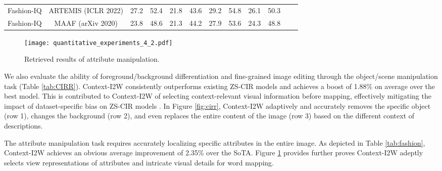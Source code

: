 \documentclass[letterpaper]{article} \usepackage{aaai24}  \usepackage{times}  \usepackage{helvet}  \usepackage{courier}  \usepackage[hyphens]{url}  \usepackage{graphicx} \urlstyle{rm} \def\UrlFont{\rm}  \usepackage{natbib}  \usepackage{caption} \frenchspacing  \setlength{\pdfpagewidth}{8.5in} \setlength{\pdfpageheight}{11in} \usepackage{algorithm}
\begin{document}
\begin{table*}[t]
{\begin{tabular}{cccccccccccc}
Fashion-IQ                  & ARTEMIS  (ICLR 2022)                                                & 27.2                                 & \multicolumn{1}{c|}{52.4}                        & 21.8                        & \multicolumn{1}{c|}{43.6}                        & 29.2                                 & \multicolumn{1}{c|}{54.8}                        & 26.1                        & 50.3                        \\
Fashion-IQ                  & MAAF (arXiv 2020)                                                    & 23.8                                 & \multicolumn{1}{c|}{48.6}                        & 21.3                        & \multicolumn{1}{c|}{44.2}                        & 27.9                                 & \multicolumn{1}{c|}{53.6}                        & 24.3                        & 48.8                        \\ \bottomrule
\end{tabular}}
\caption{Results on Fashion-IQ for attribute manipulation.}
\label{tab:fashion}
\end{table*}


\begin{figure}[t]
    \centering
\centering
    \texttt{[image: quantitative\_experiments\_4\_2.pdf]}
    \caption{Retrieved results of attribute manipulation.}
    \vspace{-10pt}
    \label{fig:fashion}
\end{figure}

We also evaluate the ability of foreground/background differentiation and fine-grained image editing through the object/scene manipulation task (Table \ref{tab:CIRR}). Context-I2W consistently outperforms existing ZS-CIR models and achieves a boost of 1.88\% on average over the best model. This is contributed to Context-I2W of selecting context-relevant visual information before mapping, effectively mitigating the impact of dataset-specific bias on ZS-CIR models \cite{Saito_2023_CVPR}. In Figure \ref{fig:cirr}, Context-I2W adaptively and accurately removes the specific object (row 1), changes the background (row 2), and even replaces the entire content of the image (row 3) based on the different context of descriptions.

The attribute manipulation task requires accurately localizing specific attributes in the entire image. As depicted in Table \ref{tab:fashion}, Context-I2W achieves an obvious average improvement of 2.35\% over the SoTA. Figure \ref{fig:fashion} provides further proves Context-I2W adeptly selects view representations of attributes and intricate visual details for word mapping.
\end{document}
